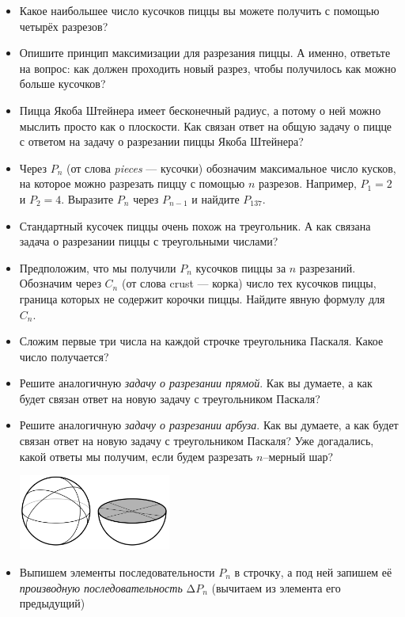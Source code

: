 \documentclass[10pt]{scrbook} \usepackage{modules/nonstahp_book}
\begin{document}
\begin{itemize}
\item Какое наибольшее число кусочков пиццы вы можете получить с помощью четырёх разрезов?
\item Опишите принцип максимизации для разрезания пиццы. А именно, ответьте на вопрос: как должен проходить новый разрез, чтобы получилось как можно больше кусочков?
\item Пицца Якоба Штейнера имеет бесконечный радиус, а потому о ней можно мыслить просто как о плоскости. Как связан ответ на общую задачу о пицце с ответом на задачу о разрезании пиццы Якоба Штейнера?
\item Через $P_n$ (от слова {\itshape pieces} --- кусочки) обозначим максимальное число кусков, на которое можно разрезать пиццу с помощью $n$ разрезов. Например, $P_1 = 2$ и $P_2 = 4$. Выразите $P_n$ через $P_{n-1}$ и найдите $P_{137}$.
\item Стандартный кусочек пиццы очень похож на треугольник. А как связана задача о разрезании пиццы с треугольными числами?
\item Предположим, что мы получили $P_n$ кусочков пиццы за $n$ разрезаний. Обозначим через $C_n$ (от слова crust --- корка) число тех кусочков пиццы, граница которых не содержит корочки пиццы. Найдите явную формулу для $C_n$.
\item Сложим первые три числа на каждой строчке треугольника Паскаля. Какое число получается?
\item Решите аналогичную {\it задачу о разрезании прямой}. Как вы думаете, а как будет связан ответ на новую задачу с треугольником Паскаля?
\item Решите аналогичную {\it задачу о разрезании арбуза}. Как вы думаете, а как будет связан ответ на новую задачу с треугольником Паскаля? Уже догадались, какой ответы мы получим, если будем разрезать $n$--мерный шар?
\begin{center}
\includegraphics[width=5cm]{PizzaC3.png}
\end{center}
\item Выпишем элементы последовательности $P_n$ в строчку, а под ней запишем её {\it производную последовательность} $\text{Δ} P_n$ (вычитаем из элемента его предыдущий)
\begin{center}

\end{center}
\end{itemize}
\end{document}
